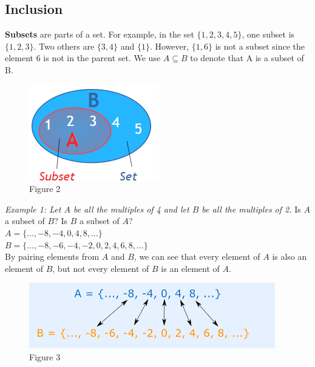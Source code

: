 \documentclass{article}
\begin{document}
            \subsection{Inclusion}

            \noindent \textbf{Subsets} are parts of a set. For example, in the set $\{1,2,3,4,5\}$,
            one subset is $\{1,2,3\}$. Two others are $\{3,4\}$ and $\{1\}$. However, $\{1,6\}$ is
            not a subset since the element 6 is not in the parent set. We use \textbf{$A \subseteq B$}
            to denote that A is a subset of B.

            \begin{figure} [hbt!]
                \centering
                \includegraphics[scale=0.6]{Resources/Unit1SetTheory/subsets.PNG}
                \caption*{Figure 2}
            \end{figure}

            \noindent \color{blue} \textit{Example 1: Let $A$ be all the multiples of 4 and let
            $B$ be all the multiples of 2.} Is $A$ a subset of $B$? Is $B$ a subset of $A$?
            \color{black} \\

            $A=\{\dots,-8,-4,0,4,8,\dots\}$\\
            $B=\{\dots,-8,-6,-4,-2,0,2,4,6,8,\dots\}$\\
            By pairing elements from $A$ and $B$, we can see that every element of $A$ is also an
            element of $B$, but not every element of $B$ is an element of $A$.\\

            \begin{figure} [hbt!]
                \centering
                \includegraphics[scale=0.6]{Resources/Unit1SetTheory/subset2.PNG}
                \caption*{Figure 3}
            \end{figure}
\end{document}
